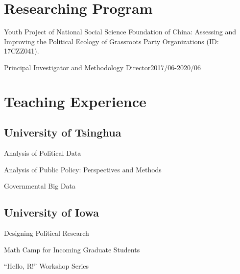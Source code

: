 \documentclass[10.5pt,]{article}
\providecommand{\tightlist}{%
	\setlength{\itemsep}{0pt}\setlength{\parskip}{0pt}}
\renewenvironment{itemize}{
	\begin{list}{}{
			\setlength{\leftmargin}{1.5em}
		}
	}{
	\end{list}
}
\begin{document}
\hypertarget{researching-program}{%
\section{Researching Program}\label{researching-program}}

\begin{itemize}
\tightlist
\item
  Youth Project of National Social Science Foundation of China:
  Assessing and Improving the Political Ecology of Grassroots Party
  Organizations (ID: 17CZZ041).

  \begin{itemize}
  \tightlist
  \item
    Principal Investigator and Methodology
    Director\hfill 2017/06-2020/06
  \end{itemize}
\end{itemize}

\hypertarget{teaching-experience}{%
\section{Teaching Experience}\label{teaching-experience}}

\hypertarget{university-of-tsinghua}{%
\subsection{University of Tsinghua}\label{university-of-tsinghua}}

\begin{itemize}
\tightlist
\item
  Analysis of Political Data
\item
  Analysis of Public Policy: Perspectives and Methods
\item
  Governmental Big Data
\end{itemize}

\hypertarget{university-of-iowa}{%
\subsection{University of Iowa}\label{university-of-iowa}}

\begin{itemize}
\tightlist
\item
  Designing Political Research
\item
  Math Camp for Incoming Graduate Students
\item
  ``Hello, R!'' Workshop Series
\end{itemize}
\end{document}
